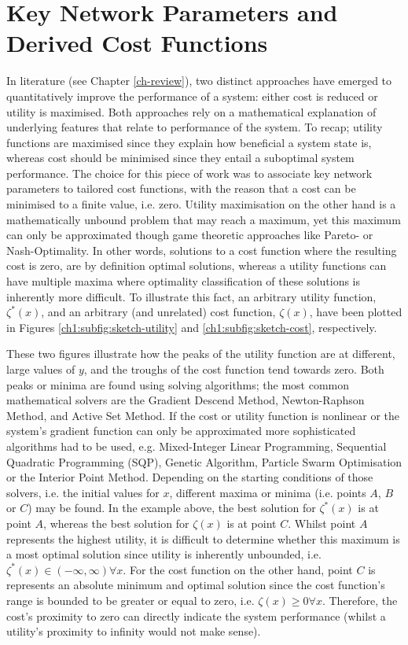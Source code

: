 \section{Key Network Parameters and Derived Cost Functions}
\label{ch1:sec:key-network-parameters}

In literature (see Chapter \ref{ch-review}), two distinct approaches have emerged to quantitatively improve the performance of a system:
either cost is reduced or utility is maximised.
Both approaches rely on a mathematical explanation of underlying features that relate to performance of the system.
To recap; utility functions are maximised since they explain how beneficial a system state is, whereas cost should be minimised since they entail a suboptimal system performance.
The choice for this piece of work was to associate key network parameters to tailored cost functions, with the reason that a cost can be minimised to a finite value, i.e. zero.
Utility maximisation on the other hand is a mathematically unbound problem that may reach a maximum, yet this maximum can only be approximated though game theoretic approaches like Pareto- or Nash-Optimality.
In other words, solutions to a cost function where the resulting cost is zero, are by definition optimal solutions, whereas a utility functions can have multiple maxima where optimality classification of these solutions is inherently more difficult.
To illustrate this fact, an arbitrary utility function, $\zeta^{*}(x)$, and an arbitrary (and unrelated) cost function, $\zeta(x)$, have been plotted in Figures \ref{ch1:subfig:sketch-utility} and \ref{ch1:subfig:sketch-cost}, respectively.



These two figures illustrate how the peaks of the utility function are at different, large values of $y$, and the troughs of the cost function tend towards zero.
Both peaks or minima are found using solving algorithms; the most common mathematical solvers are the Gradient Descend Method, Newton-Raphson Method, and Active Set Method.
If the cost or utility function is nonlinear or the system's gradient function can only be approximated more sophisticated algorithms had to be used, e.g. Mixed-Integer Linear Programming, Sequential Quadratic Programming (SQP), Genetic Algorithm, Particle Swarm Optimisation or the Interior Point Method.
Depending on the starting conditions of those solvers, i.e. the initial values for $x$, different maxima or minima (i.e. points $A$, $B$ or $C$) may be found.
In the example above, the best solution for $\zeta^{*}(x)$ is at point $A$, whereas the best solution for $\zeta(x)$ is at point $C$.
Whilst point $A$ represents the highest utility, it is difficult to determine whether this maximum is a most optimal solution since utility is inherently unbounded, i.e. $\zeta^{*}(x) \in (-\infty, \infty) \forall x$.
For the cost function on the other hand, point $C$ is represents an absolute minimum and optimal solution since the cost function's range is bounded to be greater or equal to zero, i.e. $\zeta(x) \geq 0 \forall x$.
Therefore, the cost's proximity to zero can directly indicate the system performance (whilst a utility's proximity to infinity would not make sense).

